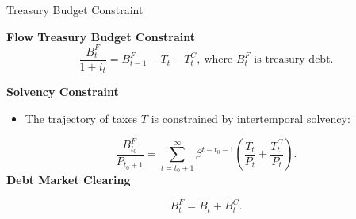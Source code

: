 \documentclass[11pt,aspectratio=169]{beamer}
\begin{document}
\begin{frame}{Treasury Budget Constraint}
\small

\textbf{Flow Treasury Budget Constraint}
\begin{equation}
\frac{B_{t}^{F}}{1+i_{t}}=B_{t-1}^{F}-T_{t}-T_{t}^{C},\ \text{where $B_{t}^{F}$ is treasury debt.}  \label{BudgetF-L}
\end{equation}
\vspace{0.3cm}

\textbf{Solvency Constraint}
\begin{itemize}
    \item The trajectory of taxes $T$ is constrained by intertemporal solvency:
\end{itemize}
\begin{equation}
\frac{B_{t_{0}}^{F}}{P_{t_{0}+1}}=\sum_{t=t_{0}+1}^{\infty }\beta ^{t-t_{0}-1}\left( \frac{T_{t}}{P_{t}}+\frac{T_{t}^{C}}{P_{t}}\right). 
\label{Solvency-L}
\end{equation}
\textbf{Debt Market Clearing}

\begin{equation}
B_{t}^{F}=B_{t}+B_{t}^{C}.  \label{Bond-L}
\end{equation}


\end{frame}
\end{document}
